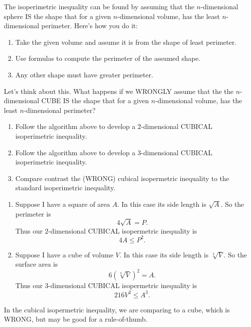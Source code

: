 \documentclass[nooutcomes,noauthor,handout]{ximera}
\begin{document}
\begin{question}
  The isoperimetric inequality can be found by assuming that the
  $n$-dimensional sphere IS the shape that for a given $n$-dimensional
  volume, has the least $n$-dimensional perimeter. Here's how you do
  it:
  \begin{enumerate}
    \item Take the given volume and assume it is from the shape of
      least perimeter.
    \item Use formulas to compute the perimeter of the assumed shape.
    \item Any other shape must have greater perimeter.
  \end{enumerate}
  Let's think about this. What happens if we WRONGLY assume that the
  the $n$-dimensional CUBE IS the shape that for a given
  $n$-dimensional volume, has the least $n$-dimensional perimeter?
  \begin{enumerate}
  \item Follow the algorithm above to develop a $2$-dimensional
    CUBICAL isoperimetric inequality.
  \item Follow the algorithm above to develop a $3$-dimensional
    CUBICAL isoperimetric inequality.
  \item Compare contrast the (WRONG) cubical isopermetric inequality
    to the standard isoperimetric inequality.
  \end{enumerate}
  \begin{freeResponse}
    \begin{enumerate}
    \item Suppose I have a square of area $A$. In this case its side length is $\sqrt{A}$. So the perimeter is
      \[
      4\sqrt{A} = P.
      \]
      Thus our $2$-dimensional CUBICAL isopermetric inequality is
      \[
      4A \le P^2.
      \]
    \item Suppose I have a cube of volume $V$. In this case its side
      length is $\sqrt[3]{V}$. So the surface area is
      \[
      6\left(\sqrt[3]{V}\right)^2 = A.
      \]
      Thus our $3$-dimensional CUBICAL isopermetric inequality is
      \[
      216 V^2 \le A^3.
      \]
    \end{enumerate}
  \item In the cubical isopermetric inequality, we are comparing to a
    cube, which is WRONG, but may be good for a rule-of-thumb.
  \end{freeResponse}
\end{question}
\end{document}
